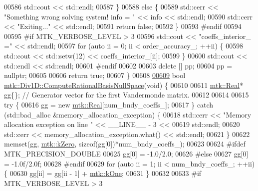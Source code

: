 \begin{DoxyCode}
{{00586     std::cout << std::endl;
00587   \}
00588   \textcolor{keywordflow}{else} \{
00589     std::cerr << \textcolor{stringliteral}{"Something wrong solving system! info = "} << info << std::endl;
00590     std::cerr << \textcolor{stringliteral}{"Exiting..."} << std::endl;
00591     \textcolor{keywordflow}{return} \textcolor{keyword}{false};
00592   \}
00593 \textcolor{preprocessor}{  #endif}
00594 
00595 \textcolor{preprocessor}{  #if MTK\_VERBOSE\_LEVEL > 3}
00596   std::cout << \textcolor{stringliteral}{"coeffs\_interior\_ ="} << std::endl;
00597   \textcolor{keywordflow}{for} (\textcolor{keyword}{auto} ii = 0; ii < order\_accuracy\_; ++ii) \{
00598     std::cout << std::setw(12) << coeffs\_interior\_[ii];
00599   \}
00600   std::cout << std::endl << std::endl;
00601 \textcolor{preprocessor}{  #endif}
00602 
00603   \textcolor{keyword}{delete} [] pp;
00604   pp = \textcolor{keyword}{nullptr};
00605 
00606   \textcolor{keywordflow}{return} \textcolor{keyword}{true};
00607 \}
00608 
\hypertarget{mtk__div__1d_8cc_source_l00609}{}\hyperlink{classmtk_1_1Div1D_aa0c0c278b2c00a29c1ceaa70d31aebab}{00609} \textcolor{keywordtype}{bool} \hyperlink{classmtk_1_1Div1D_aa0c0c278b2c00a29c1ceaa70d31aebab}{mtk::Div1D::ComputeRationalBasisNullSpace}(\textcolor{keywordtype}{void}) \{
00610 
00611   \hyperlink{group__c01-roots_gac080bbbf5cbb5502c9f00405f894857d}{mtk::Real}* gg\{\}; \textcolor{comment}{// Generator vector for the first Vandermonde matrix.}
00612 
00614 
00615   \textcolor{keywordflow}{try} \{
00616     gg = \textcolor{keyword}{new} \hyperlink{group__c01-roots_gac080bbbf5cbb5502c9f00405f894857d}{mtk::Real}[num\_bndy\_coeffs\_];
00617   \} \textcolor{keywordflow}{catch} (std::bad\_alloc &memory\_allocation\_exception) \{
00618     std::cerr << \textcolor{stringliteral}{"Memory allocation exception on line "} << \_\_LINE\_\_ - 3 <<
00619       std::endl;
00620     std::cerr << memory\_allocation\_exception.what() << std::endl;
00621   \}
00622   memset(gg, \hyperlink{group__c01-roots_ga59a451a5fae30d59649bcda274fea271}{mtk::kZero}, \textcolor{keyword}{sizeof}(gg[0])*num\_bndy\_coeffs\_);
00623 
00624 \textcolor{preprocessor}{  #ifdef MTK\_PRECISION\_DOUBLE}
00625   gg[0] = -1.0/2.0;
00626 \textcolor{preprocessor}{  #else}
00627   gg[0] = -1.0f/2.0f;
00628 \textcolor{preprocessor}{  #endif}
00629   \textcolor{keywordflow}{for} (\textcolor{keyword}{auto} ii = 1; ii < num\_bndy\_coeffs\_; ++ii) \{
00630     gg[ii] = gg[ii - 1] + \hyperlink{group__c01-roots_ga26407c24d43b6b95480943340d285c71}{mtk::kOne};
00631   \}
00632 
00633 \textcolor{preprocessor}{  #if MTK\_VERBOSE\_LEVEL > 3}
}}
\end{DoxyCode}
